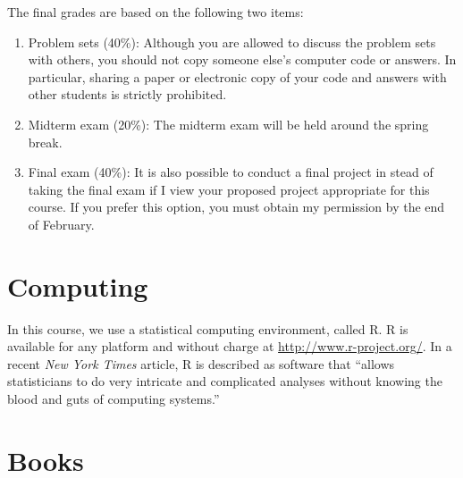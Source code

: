 \documentclass[11pt]{article}
\begin{document}
The final grades are based on the following two items:
\begin{enumerate}
\item Problem sets (40\%): Although you are allowed to discuss the
  problem sets with others, you should not copy someone else's
  computer code or answers.  In particular, sharing a paper or
  electronic copy of your code and answers with other students is
  strictly prohibited.
 
\item Midterm exam (20\%): The midterm exam will be held around the
  spring break.

\item Final exam (40\%): It is also possible to conduct a
  final project in stead of taking the final exam if I view your
  proposed project appropriate for this course.  If you prefer this
  option, you must obtain my permission by the end of February.

\end{enumerate} 

\section{Computing}

In this course, we use a statistical computing environment, called R.
R is available for any platform and without charge at \href{
  http://www.r-project.org/}{http://www.r-project.org/}.  In a recent
{\it New York Times} article, R is described as software that ``allows
statisticians to do very intricate and complicated analyses without
knowing the blood and guts of computing systems.''

\section{Books}
\end{document}
